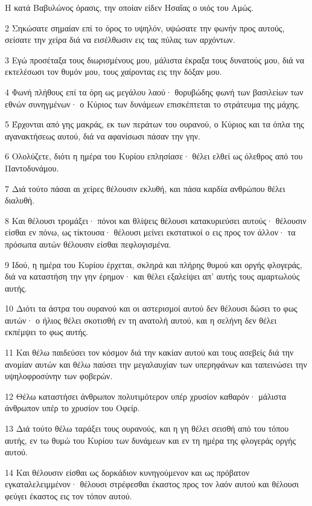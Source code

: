 \par Η κατά Βαβυλώνος όρασις, την οποίαν είδεν Ησαΐας ο υιός του Αμώς.
\par 2 Σηκώσατε σημαίαν επί το όρος το υψηλόν, υψώσατε την φωνήν προς αυτούς, σείσατε την χείρα διά να εισέλθωσιν εις τας πύλας των αρχόντων.
\par 3 Εγώ προσέταξα τους διωρισμένους μου, μάλιστα έκραξα τους δυνατούς μου, διά να εκτελέσωσι τον θυμόν μου, τους χαίροντας εις την δόξαν μου.
\par 4 Φωνή πλήθους επί τα όρη ως μεγάλου λαού· θορυβώδης φωνή των βασιλείων των εθνών συνηγμένων· ο Κύριος των δυνάμεων επισκέπτεται το στράτευμα της μάχης.
\par 5 Έρχονται από γης μακράς, εκ των περάτων του ουρανού, ο Κύριος και τα όπλα της αγανακτήσεως αυτού, διά να αφανίσωσι πάσαν την γην.
\par 6 Ολολύζετε, διότι η ημέρα του Κυρίου επλησίασε· θέλει ελθεί ως όλεθρος από του Παντοδυνάμου.
\par 7 Διά τούτο πάσαι αι χείρες θέλουσιν εκλυθή, και πάσα καρδία ανθρώπου θέλει διαλυθή.
\par 8 Και θέλουσι τρομάξει· πόνοι και θλίψεις θέλουσι κατακυριεύσει αυτούς· θέλουσιν είσθαι εν πόνω, ως τίκτουσα· θέλουσι μείνει εκστατικοί ο εις προς τον άλλον· τα πρόσωπα αυτών θέλουσιν είσθαι πεφλογισμένα.
\par 9 Ιδού, η ημέρα του Κυρίου έρχεται, σκληρά και πλήρης θυμού και οργής φλογεράς, διά να καταστήση την γην έρημον· και θέλει εξαλείψει απ' αυτής τους αμαρτωλούς αυτής.
\par 10 Διότι τα άστρα του ουρανού και οι αστερισμοί αυτού δεν θέλουσι δώσει το φως αυτών· ο ήλιος θέλει σκοτισθή εν τη ανατολή αυτού, και η σελήνη δεν θέλει εκπέμψει το φως αυτής.
\par 11 Και θέλω παιδεύσει τον κόσμον διά την κακίαν αυτού και τους ασεβείς διά την ανομίαν αυτών και θέλω παύσει την μεγαλαυχίαν των υπερηφάνων και ταπεινώσει την υψηλοφροσύνην των φοβερών.
\par 12 Θέλω καταστήσει άνθρωπον πολυτιμότερον υπέρ χρυσίον καθαρόν· μάλιστα άνθρωπον υπέρ το χρυσίον του Οφείρ.
\par 13 Διά τούτο θέλω ταράξει τους ουρανούς, και η γη θέλει σεισθή από του τόπου αυτής, εν τω θυμώ του Κυρίου των δυνάμεων και εν τη ημέρα της φλογεράς οργής αυτού.
\par 14 Και θέλουσιν είσθαι ως δορκάδιον κυνηγούμενον και ως πρόβατον εγκαταλελειμμένον· θέλουσι στρέφεσθαι έκαστος προς τον λαόν αυτού και θέλουσι φεύγει έκαστος εις τον τόπον αυτού.
